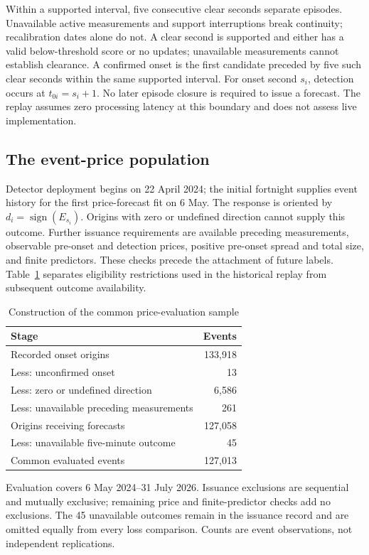 \documentclass[12pt,letterpaper]{article}
\begin{document}
Within a supported interval, five consecutive clear seconds separate episodes. Unavailable active measurements and support interruptions break continuity; recalibration dates alone do not. A clear second is supported and either has a valid below-threshold score or no updates; unavailable measurements cannot establish clearance. A confirmed onset is the first candidate preceded by five such clear seconds within the same supported interval. For onset second $s_i$, detection occurs at $t_{0i}=s_i+1$. No later episode closure is required to issue a forecast. The replay assumes zero processing latency at this boundary and does not assess live implementation.

\subsection{The event-price population}
Detector deployment begins on 22 April 2024; the initial fortnight supplies event history for the first price-forecast fit on 6 May. The response is oriented by $d_i=\operatorname{sign}(E_{s_i})$. Origins with zero or undefined direction cannot supply this outcome. Further issuance requirements are available preceding measurements, observable pre-onset and detection prices, positive pre-onset spread and total size, and finite predictors. These checks precede the attachment of future labels. Table~\ref{tab:sample} separates eligibility restrictions used in the historical replay from subsequent outcome availability.

\begin{table}[htbp]\centering
\caption{Construction of the common price-evaluation sample}\label{tab:sample}
\begin{tabular}{lr}\toprule
Stage & Events\\\midrule
Recorded onset origins &133,918\\
Less: unconfirmed onset &13\\
Less: zero or undefined direction &6,586\\
Less: unavailable preceding measurements &261\\
Origins receiving forecasts &127,058\\
Less: unavailable five-minute outcome &45\\
Common evaluated events &127,013\\\bottomrule
\end{tabular}
\par\smallskip\begin{minipage}{0.94\linewidth}\footnotesize
Evaluation covers 6 May 2024--31 July 2026. Issuance exclusions are sequential and mutually exclusive; remaining price and finite-predictor checks add no exclusions. The 45 unavailable outcomes remain in the issuance record and are omitted equally from every loss comparison. Counts are event observations, not independent replications.
\end{minipage}\end{table}
\end{document}
